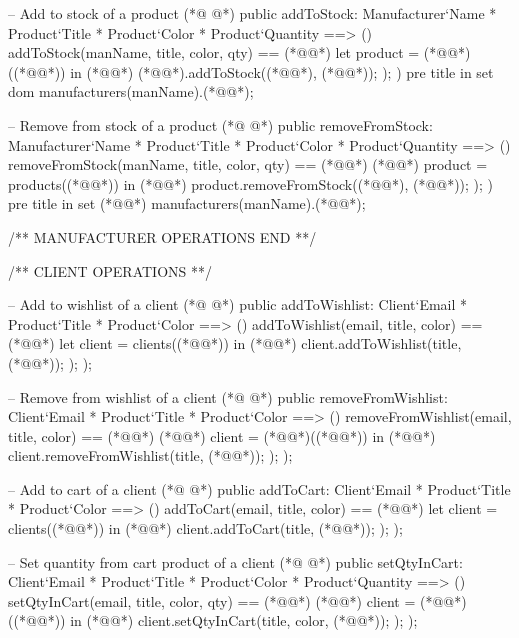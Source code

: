 \begin{vdmpp}[breaklines=true]
 -- Add to stock of a product
(*@
\label{addToStock:103}
@*)
 public addToStock: Manufacturer`Name * Product`Title * Product`Color * Product`Quantity ==> ()
 addToStock(manName, title, color, qty) == (*@\vdmnotcovered{(}@*)
  let product = (*@@*)((*@@*))
  in (*@\vdmnotcovered{(}@*)
   (*@@*).addToStock((*@@*), (*@@*));
  );
 )
 pre title in set dom manufacturers(manName).(*@@*);
 
 -- Remove from stock of a product
(*@
\label{removeFromStock:113}
@*)
 public removeFromStock: Manufacturer`Name * Product`Title * Product`Color * Product`Quantity ==> ()
 removeFromStock(manName, title, color, qty) == (*@\vdmnotcovered{(}@*)
  (*@@*) product = products((*@@*))
  in (*@\vdmnotcovered{(}@*)
   product.removeFromStock((*@@*), (*@@*));
  );
 )
 pre title in set (*@@*) manufacturers(manName).(*@@*);
 
 /** MANUFACTURER OPERATIONS END **/


 /** CLIENT OPERATIONS **/
 
 -- Add to wishlist of a client
(*@
\label{addToWishlist:128}
@*)
 public addToWishlist: Client`Email * Product`Title * Product`Color ==> ()
 addToWishlist(email, title, color) == (*@\vdmnotcovered{(}@*)
  let client = clients((*@@*))
  in (*@\vdmnotcovered{(}@*)
   client.addToWishlist(title, (*@@*));
  );
 );
 
 -- Remove from wishlist of a client
(*@
\label{removeFromWishlist:137}
@*)
 public removeFromWishlist: Client`Email * Product`Title * Product`Color ==> ()
 removeFromWishlist(email, title, color) == (*@\vdmnotcovered{(}@*)
  (*@@*) client = (*@@*)((*@@*))
  in (*@\vdmnotcovered{(}@*)
   client.removeFromWishlist(title, (*@@*));
  );
 );
 
 -- Add to cart of a client
(*@
\label{addToCart:146}
@*)
 public addToCart: Client`Email * Product`Title * Product`Color ==> ()
 addToCart(email, title, color) == (*@\vdmnotcovered{(}@*)
  let client = clients((*@@*))
  in (*@\vdmnotcovered{(}@*)
   client.addToCart(title, (*@@*));
  );
 );
 
 -- Set quantity from cart product of a client
(*@
\label{setQtyInCart:155}
@*)
 public setQtyInCart: Client`Email * Product`Title * Product`Color * Product`Quantity ==> ()
 setQtyInCart(email, title, color, qty) == (*@\vdmnotcovered{(}@*)
  (*@@*) client = (*@@*)((*@@*))
  in (*@\vdmnotcovered{(}@*)
   client.setQtyInCart(title, color, (*@@*));
  );
 );
 

\end{vdmpp}
